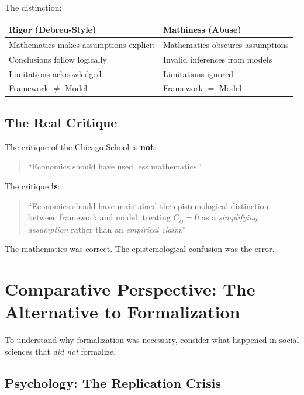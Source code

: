 \documentclass[12pt,a4paper]{article}
\begin{document}
The distinction:
\begin{table}[H]
\centering
\renewcommand{\arraystretch}{1.3}
\begin{tabular}{@{}p{5.5cm}p{5.5cm}@{}}
\toprule
\textbf{Rigor (Debreu-Style)} & \textbf{Mathiness (Abuse)} \\
\midrule
Mathematics makes assumptions explicit & Mathematics obscures assumptions \\
Conclusions follow logically & Invalid inferences from models \\
Limitations acknowledged & Limitations ignored \\
Framework $\neq$ Model & Framework $=$ Model \\
\bottomrule
\end{tabular}
\end{table}

\subsection{The Real Critique}

The critique of the Chicago School is \textbf{not}:
\begin{quote}
``Economics should have used less mathematics.''
\end{quote}

The critique \textbf{is}:
\begin{quote}
``Economics should have maintained the epistemological distinction between framework and model, treating $C_{ij} = 0$ as a \textit{simplifying assumption} rather than an \textit{empirical claim}.''
\end{quote}

The mathematics was correct. The epistemological confusion was the error.

\section{Comparative Perspective: The Alternative to Formalization}
\label{sec:comparative}

To understand why formalization was necessary, consider what happened in social sciences that \textit{did not} formalize.

\subsection{Psychology: The Replication Crisis}
\end{document}
